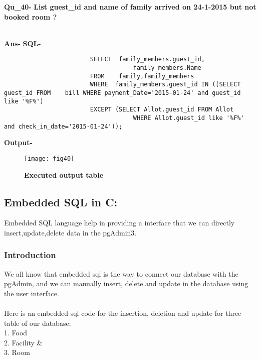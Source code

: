 \documentclass[a4,12pt]{report}
\begin{document}
\newpage
\textbf{Qu\_40-}  \textbf{List guest\_id and name of family arrived on 24-1-2015 but not booked room  ?} \\\

\textbf{Ans-}		\textbf{SQL-}
\begin{lstlisting}
						SELECT  family_members.guest_id,
									family_members.Name  
						FROM 	family,family_members  
						WHERE  family_members.guest_id IN ((SELECT guest_id FROM 	bill WHERE payment_Date='2015-01-24' and guest_id like '%F%') 
						EXCEPT (SELECT Allot.guest_id FROM Allot
									WHERE Allot.guest_id like '%F%' and check_in_date='2015-01-24'));
\end{lstlisting}
\textbf{Output-} \\			   
\begin{figure}[hbtp]
\centering
\texttt{[image: fig40]}
\caption{\textbf{{\color{red}Executed output table}}}
\end{figure}

\newpage
\subsection*{Embedded SQL in C:}
Embedded SQL language help in providing a interface that we can directly insert,update,delete data in the pgAdmin3.
\subsubsection*{Introduction}
 We all know that embedded sql is the way to connect our database with the pgAdmin, and we can manually insert, delete and update in the database using the user interface.\\\\
 
Here is an embedded sql code for the insertion, deletion and update for three table of our database:\\
1. Food \\
2. Facility \&\\
3. Room \\\\
\end{document}
